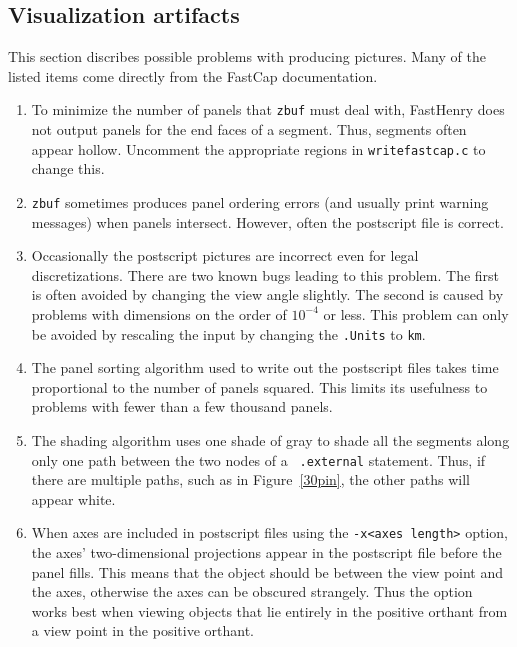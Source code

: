 \subsection{Visualization artifacts}

This section discribes possible problems with producing pictures.
Many of the listed items come directly from the FastCap documentation.

\begin{enumerate}
\item To minimize the number of panels that {\tt zbuf} must deal with,
FastHenry does not output panels for the end faces of a segment.
Thus, segments often appear hollow.  Uncomment the appropriate
regions in {\tt writefastcap.c} to change this. 
\item {\tt zbuf} sometimes produces panel ordering errors (and
usually print warning messages) when panels intersect. However, often
the postscript file is correct.
\item Occasionally the postscript pictures are incorrect even
for legal discretizations. There are two known bugs leading
to this problem.  The first is often avoided by changing
the view angle slightly. The second is caused by problems with
dimensions on the order of $10^{-4}$ or less. This problem can
only be avoided by rescaling the input by changing the {\tt .Units}
to {\tt km}.
\item The panel sorting algorithm used to write out the postscript files
takes time proportional to the number of panels squared.  This limits
its usefulness to problems with fewer than a few thousand panels. 
\item The shading algorithm uses one shade of gray to shade 
all the segments along only one path between the two nodes of a {\tt
.external} statement. Thus, if there are multiple paths, such as in
Figure~\ref{30pin}, the other paths will appear white.
\item When axes are included in postscript files using the
{\tt -x<axes length>} option, the axes' two-dimensional projections
appear in the postscript file before the panel fills. This means
that the object should be between the view point and the axes, otherwise
the axes can be obscured strangely. 
Thus
the option works best when viewing objects that lie entirely in
the positive orthant from a view point in the positive orthant.

\end{enumerate}


